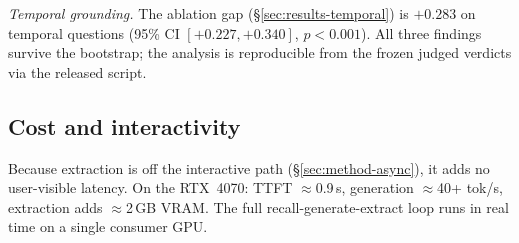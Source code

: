 \emph{Temporal grounding.} The ablation gap (\S\ref{sec:results-temporal}) is
$+0.283$ on temporal questions (95\% CI $[+0.227, +0.340]$, $p<0.001$). All
three findings survive the bootstrap; the analysis is reproducible from the
frozen judged verdicts via the released  script.

\subsection{Cost and interactivity}
Because extraction is off the interactive path (\S\ref{sec:method-async}), it
adds no user-visible latency. On the RTX~4070: TTFT $\approx$0.9\,s, generation
$\approx$40+ tok/s, extraction adds $\approx$2\,GB VRAM. The full recall-generate-extract
loop runs in real time on a single consumer GPU.

